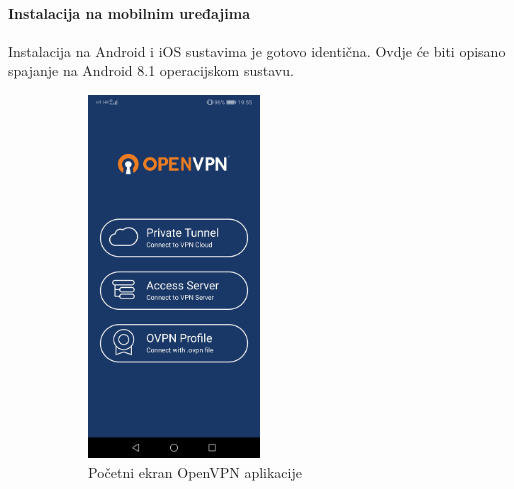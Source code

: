 \paragraph*{Instalacija na mobilnim uređajima}
\hfill \smallbreak
Instalacija na Android i iOS sustavima je gotovo identična. Ovdje će biti opisano spajanje na Android 8.1 operacijskom sustavu.
\begin{figure}[!ht]
	\centering
	\begin{subfigure}{0.49\textwidth}
		\centering
		\includegraphics[width = 0.5\textwidth]{slike/OpenVPN/Screenshot_20181214-195518}
		\caption{Početni ekran OpenVPN aplikacije}
		\label{fig:screenshot20181214-195518}
	\end{subfigure}
	\begin{subfigure}{0.49\textwidth}
		\centering

\end{subfigure}
\end{figure}
